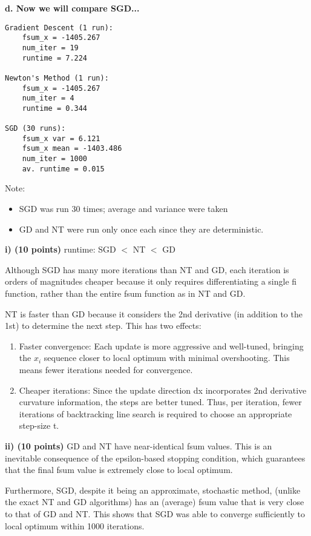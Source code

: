 \documentclass[a4paper,10pt]{article}
\theoremstyle{definition}
\begin{document}
\textbf{d. Now we will compare SGD...}
\begin{verbatim}
Gradient Descent (1 run):
    fsum_x = -1405.267
    num_iter = 19
    runtime = 7.224

Newton's Method (1 run):
    fsum_x = -1405.267
    num_iter = 4
    runtime = 0.344

SGD (30 runs):
    fsum_x var = 6.121
    fsum_x mean = -1403.486
    num_iter = 1000
    av. runtime = 0.015
\end{verbatim}

Note:
\begin{itemize}
    \item SGD was run 30 times; average and variance were taken
    \item GD and NT were run only once each since they are deterministic.
\end{itemize}


\textbf{i) (10 points)}
runtime: SGD $<$ NT $<$ GD

Although SGD has many more iterations than NT and GD, each iteration is
orders of magnitudes cheaper because it only requires differentiating a single fi function,
rather than the entire fsum function as in NT and GD.

NT is faster than GD because it considers the 2nd derivative (in addition to the 1st) to
determine the next step. This has two effects:
\begin{enumerate}
    \item Faster convergence: Each update is more aggressive and well-tuned, 
        bringing the $x_i$ sequence closer to local optimum with minimal overshooting. 
        This means fewer iterations needed for convergence.
    \item Cheaper iterations: Since the update direction dx incorporates 2nd derivative curvature
information, the steps are better tuned. Thus, per iteration, fewer iterations of backtracking
line search is required to choose an appropriate step-size t.
\end{enumerate}

\textbf{ii) (10 points)}
GD and NT have near-identical fsum values.
This is an inevitable consequence of the epsilon-based stopping condition,
which guarantees that the final fsum value is extremely close to local optimum.

Furthermore, SGD, despite it being an approximate, stochastic method, (unlike
the exact NT and GD algorithms) has an (average) fsum value that is very
close to that of GD and NT. This shows that SGD was able to converge sufficiently
to local optimum within 1000 iterations.
\end{document}
